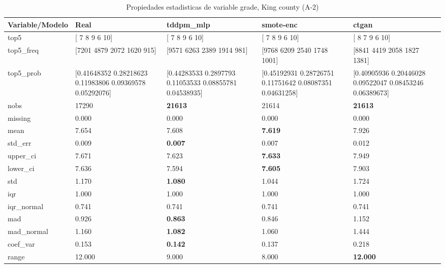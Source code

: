 \begin{table}[H]
\centering
\fontsize{8}{14}\selectfont
\caption{Propiedades  estadisticas de variable grade, King county (A-2)}
\label{table-stats-king county-a-2-grade}
\begin{tabular}{|l|m{10em}|m{10em}|m{10em}|m{10em}|}
\hline
 \rowcolor[gray]{0.8}
Variable/Modelo & Real & tddpm\_mlp & smote-enc & ctgan \\
\hline top5 & [ 7  8  9  6 10] & [ 7  8  9  6 10] & [ 7  8  9  6 10] & [ 8  7  9  6 10] \\
\hline top5\_freq & [7201 4879 2072 1620  915] & [9571 6263 2389 1914  981] & [9768 6209 2540 1748 1001] & [8841 4419 2058 1827 1381] \\
\hline top5\_prob & [0.41648352 0.28218623 0.11983806 0.09369578 0.05292076] & [0.44283533 0.2897793  0.11053533 0.08855781 0.04538935] & [0.45192931 0.28726751 0.11751642 0.08087351 0.04631258] & [0.40905936 0.20446028 0.09522047 0.08453246 0.06389673] \\
\hline nobs & 17290 & \bfseries 21613 & \cellcolor[rgb]{0.9, 0.54, 0.52} 21614 & \bfseries 21613 \\
\hline missing & 0.000 & 0.000 & 0.000 & 0.000 \\
\hline mean & 7.654 & 7.608 & \bfseries 7.619 & \cellcolor[rgb]{0.9, 0.54, 0.52} 7.926 \\
\hline std\_err & 0.009 & \bfseries 0.007 & 0.007 & \cellcolor[rgb]{0.9, 0.54, 0.52} 0.012 \\
\hline upper\_ci & 7.671 & 7.623 & \bfseries 7.633 & \cellcolor[rgb]{0.9, 0.54, 0.52} 7.949 \\
\hline lower\_ci & 7.636 & 7.594 & \bfseries 7.605 & \cellcolor[rgb]{0.9, 0.54, 0.52} 7.903 \\
\hline std & 1.170 & \bfseries 1.080 & 1.044 & \cellcolor[rgb]{0.9, 0.54, 0.52} 1.724 \\
\hline iqr & 1.000 & 1.000 & 1.000 & 1.000 \\
\hline iqr\_normal & 0.741 & 0.741 & 0.741 & 0.741 \\
\hline mad & 0.926 & \bfseries 0.863 & 0.846 & \cellcolor[rgb]{0.9, 0.54, 0.52} 1.152 \\
\hline mad\_normal & 1.160 & \bfseries 1.082 & 1.060 & \cellcolor[rgb]{0.9, 0.54, 0.52} 1.444 \\
\hline coef\_var & 0.153 & \bfseries 0.142 & 0.137 & \cellcolor[rgb]{0.9, 0.54, 0.52} 0.218 \\
\hline range & 12.000 & 9.000 & \cellcolor[rgb]{0.9, 0.54, 0.52} 8.000 & \bfseries 12.000 \\

\end{tabular}
\end{table}
